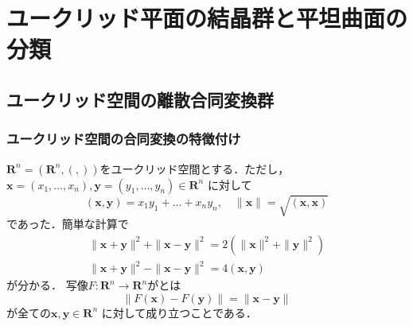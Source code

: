%
%
%
%
%
%
%
%
%
%

\chapter{ユークリッド平面の結晶群と平坦曲面の分類}
\section{ユークリッド空間の離散合同変換群}
\subsection{ユークリッド空間の合同変換の特徴付け}
$\mathbf R^n=(\mathbf R^n,(,))$をユークリッド空間とする．ただし，$\mathbf x=(x_1,\dots,x_n),
	\mathbf y=(y_1,\dots,y_n)\in \mathbf R^n$ に対して
\[
	(\mathbf x,\mathbf y)
	= 
	x_1y_1+\dots +x_ny_n,\quad
	\|\mathbf x\|
	=
	\sqrt{(\mathbf x,\mathbf x)}
\]
であった．簡単な計算で
\begin{gather}
	\|\mathbf x+\mathbf y\|^2 + \|\mathbf x-\mathbf y\|^2
	=
	2(\|\mathbf x\|^2+ \|\mathbf y\|^2)\label{normNorm}\\
	\|\mathbf x+\mathbf y\|^2 -\|\mathbf x-\mathbf y\|^2
	=
	4(\mathbf x,\mathbf y)\label{normInnerP}\
\end{gather}
が分かる．
写像$F:\mathbf R^n\to \mathbf R^n$がとは
\begin{equation}\label{congruentT}
	  \|F(\mathbf x)-F(\mathbf y)\|
	  =
	  \|\mathbf x-\mathbf y\|
\end{equation}
が全ての$\mathbf x,\mathbf y\in \mathbf R^n$ に対して成り立つことである．


